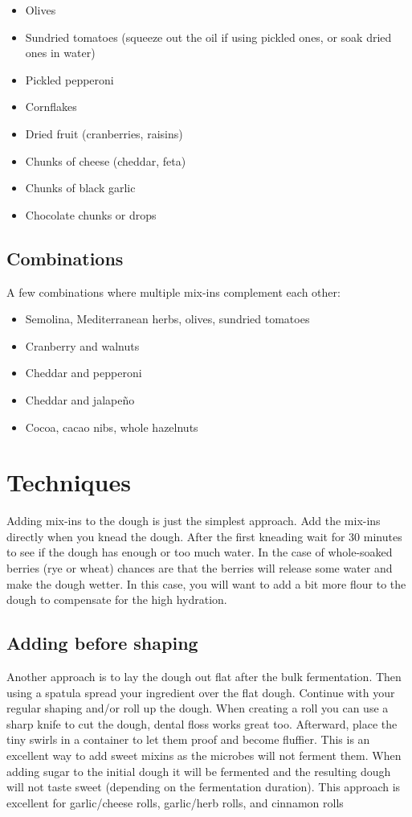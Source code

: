 \begin{itemize}
  \item Olives
  \item Sundried tomatoes (squeeze out the oil if using pickled ones, or soak 
      dried ones in water)
  \item Pickled pepperoni
  \item Cornflakes
  \item Dried fruit (\eg cranberries, raisins)
  \item Chunks of cheese (\eg cheddar, feta)
  \item Chunks of black garlic
  \item Chocolate chunks or drops
\end{itemize}

\subsection{Combinations}
A few combinations where multiple mix-ins complement each other:

\begin{itemize}
  \item Semolina, Mediterranean herbs, olives, sundried tomatoes
  \item Cranberry and walnuts
  \item Cheddar and pepperoni
  \item Cheddar and jalapeño
  \item Cocoa, cacao nibs, whole hazelnuts
\end{itemize}

\section{Techniques}

Adding mix-ins to the dough is just the simplest approach. Add the mix-ins
directly when you knead the dough. After the first kneading wait for 30 minutes to see
if the dough has enough or too much water. In the case of whole-soaked berries
(\eg rye or wheat) chances are that the berries will release some water and make the dough
wetter. In this case, you will want to add a bit more flour to the dough to
compensate for the high hydration.

\subsection{Adding before shaping}

Another approach is to lay the dough out flat after the bulk fermentation.
Then using a spatula spread your ingredient over the flat dough. Continue with
your regular shaping and/or roll up the dough. When creating a roll you can
use a sharp knife to cut the dough, dental floss works great too. Afterward,
place the tiny swirls in a container to let them proof and become fluffier. This is an
excellent way to add sweet mixins as the microbes will not ferment them. When
adding sugar to the initial dough it will be fermented and the resulting dough
will not taste sweet (depending on the fermentation duration). This approach
is excellent for garlic/cheese rolls, garlic/herb rolls, and cinnamon rolls

